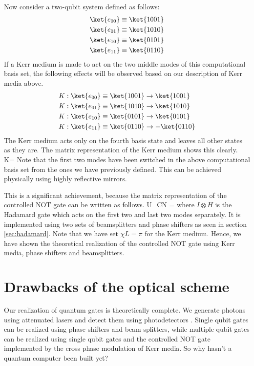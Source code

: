 Now consider a two-qubit system defined as follows:
\begin{align}
\ket{e_{00}} &\equiv \ket{1001}\\
\ket{e_{01}} &\equiv \ket{1010}\\
\ket{e_{10}} &\equiv \ket{0101}\\
\ket{e_{11}} &\equiv \ket{0110}
\end{align}
If a Kerr medium is made to act on the two middle modes of this computational basis set, the following effects will be observed based on our description of Kerr media above.
\begin{align}
K:\ket{e_{00}} &\equiv \ket{1001}\rightarrow \ket{1001}\\
K:\ket{e_{01}} &\equiv \ket{1010}\rightarrow \ket{1010}\\
K:\ket{e_{10}} &\equiv \ket{0101}\rightarrow \ket{0101}\\
K:\ket{e_{11}} &\equiv \ket{0110}\rightarrow -\ket{0110}
\end{align}
The Kerr medium acts only on the fourth basis state and leaves all other states as they are. The matrix representation of the Kerr medium shows this clearly.
\beq
K= 
\eeq
Note that the first two modes have been switched in the above computational basis set from the ones we have previously defined. This can be achieved physically using highly reflective mirrors.

This is a significant achievement, because the matrix representation of the controlled NOT gate can be written as follows.
\beq
U_{CN} = 
\eeq
where $I\otimes H$ is the Hadamard gate which acts on the first two and last two modes separately. It is implemented using two sets of beamsplitters and phase shifters as seen in section \ref{sec:hadamard}. Note that we have set $\chi L = \pi$ for the Kerr medium. Hence, we have shown the theoretical realization of the controlled NOT gate using Kerr media, phase shifters and beamsplitters.

\section{Drawbacks of the optical scheme}
Our realization of quantum gates is theoretically complete. We generate photons using attenuated lasers and detect them using photodetectors \cite{klm,nielsen2000}. Single qubit gates can be realized using phase shifters and beam splitters, while multiple qubit gates can be realized using single qubit gates and the controlled NOT gate implemented by the cross phase modulation of Kerr media. So why hasn't a quantum computer been built yet?


